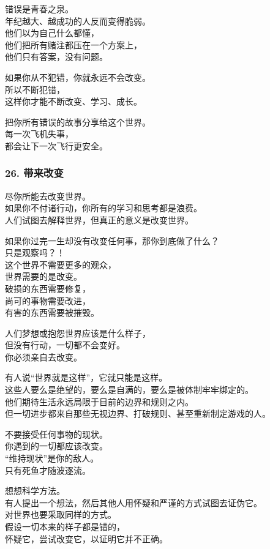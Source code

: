 \documentclass[
]{article}
\begin{document}
错误是青春之泉。\\
年纪越大、越成功的人反而变得脆弱。\\
他们以为自己什么都懂，\\
他们把所有赌注都压在一个方案上，\\
他们只有答案，没有问题。

如果你从不犯错，你就永远不会改变。\\
所以不断犯错，\\
这样你才能不断改变、学习、成长。

把你所有错误的故事分享给这个世界。\\
每一次飞机失事，\\
都会让下一次飞行更安全。

\subsubsection{26. 带来改变}\label{26-ux5e26ux6765ux6539ux53d8}

尽你所能去改变世界。\\
如果你不付诸行动，你所有的学习和思考都是浪费。\\
人们试图去解释世界，但真正的意义是改变世界。

如果你过完一生却没有改变任何事，那你到底做了什么？\\
只是观察吗？！\\
这个世界不需要更多的观众，\\
世界需要的是改变。\\
破损的东西需要修复，\\
尚可的事物需要改进，\\
有害的东西需要被摧毁。

人们梦想或抱怨世界应该是什么样子，\\
但没有行动，一切都不会变好。\\
你必须亲自去改变。

有人说``世界就是这样''，它就只能是这样。\\
这些人要么是绝望的，要么是自满的，要么是被体制牢牢绑定的。\\
他们期待生活永远局限于目前的边界和规则之内。\\
但一切进步都来自那些无视边界、打破规则、甚至重新制定游戏的人。

不要接受任何事物的现状。\\
你遇到的一切都应该改变。\\
``维持现状''是你的敌人。\\
只有死鱼才随波逐流。

想想科学方法。\\
有人提出一个想法，然后其他人用怀疑和严谨的方式试图去证伪它。\\
对世界也要采取同样的方式。\\
假设一切本来的样子都是错的，\\
怀疑它，尝试改变它，以证明它并不正确。
\end{document}
